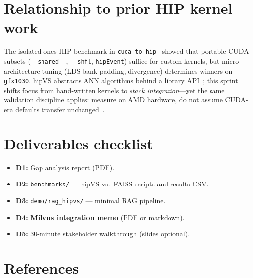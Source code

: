 \documentclass[11pt,a4paper]{article}
\begin{document}
\section{Relationship to prior HIP kernel work}
\label{sec:prior}

The isolated-ones HIP benchmark in \texttt{cuda-to-hip}~\cite{cuda-to-hip-repo}
showed that portable CUDA subsets (\texttt{\_\_shared\_\_}, \texttt{\_\_shfl},
\texttt{hipEvent}) suffice for custom kernels, but micro-architecture tuning
(LDS bank padding, divergence) determines winners on \texttt{gfx1030}.
hipVS abstracts ANN algorithms behind a library API~\cite{hipvs-docs}; this sprint
shifts focus from hand-written kernels to \emph{stack integration}---yet the
same validation discipline applies: measure on AMD hardware, do not assume
CUDA-era defaults transfer unchanged~\cite{hip-porting,hipify-device-api}.

\section{Deliverables checklist}
\label{sec:deliverables}

\begin{itemize}[leftmargin=*]
  \item[\checkmark] \textbf{D1:} Gap analysis report (PDF).
  \item[\checkmark] \textbf{D2:} \texttt{benchmarks/} --- hipVS vs.\ FAISS scripts and results CSV.
  \item[\checkmark] \textbf{D3:} \texttt{demo/rag\_hipvs/} --- minimal RAG pipeline.
  \item[\checkmark] \textbf{D4:} \textbf{Milvus integration memo} (PDF or markdown).
  \item[\checkmark] \textbf{D5:} 30-minute stakeholder walkthrough (slides optional).
\end{itemize}

\section{References}



\end{document}
